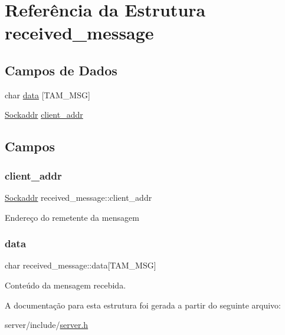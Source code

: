 \hypertarget{structreceived__message}{}\section{Referência da Estrutura received\+\_\+message}
\label{structreceived__message}
\subsection*{Campos de Dados}
\begin{DoxyCompactItemize}
\item 
char \hyperlink{structreceived__message_ada9c34d3c26df419fa3dd0ac2c20e860}{data} \mbox{[}T\+A\+M\+\_\+\+M\+SG\mbox{]}
\item 
\hyperlink{server_8h_a2645d40a71683d956e55bcf7a6823530}{Sockaddr} \hyperlink{structreceived__message_ad56a4c16bef95bef52ac591efe2582ec}{client\+\_\+addr}
\end{DoxyCompactItemize}


\subsection{Campos}
\mbox{\label{structreceived__message_ad56a4c16bef95bef52ac591efe2582ec}} 
\subsubsection{\texorpdfstring{client\+\_\+addr}{client\_addr}}
{\footnotesize\ttfamily \hyperlink{server_8h_a2645d40a71683d956e55bcf7a6823530}{Sockaddr} received\+\_\+message\+::client\+\_\+addr}

Endereço do remetente da mensagem \mbox{\label{structreceived__message_ada9c34d3c26df419fa3dd0ac2c20e860}} 
\subsubsection{\texorpdfstring{data}{data}}
{\footnotesize\ttfamily char received\+\_\+message\+::data\mbox{[}T\+A\+M\+\_\+\+M\+SG\mbox{]}}

Conteúdo da mensagem recebida. 

A documentação para esta estrutura foi gerada a partir do seguinte arquivo\+:\begin{DoxyCompactItemize}
\item 
server/include/\hyperlink{server_8h}{server.\+h}\end{DoxyCompactItemize}
